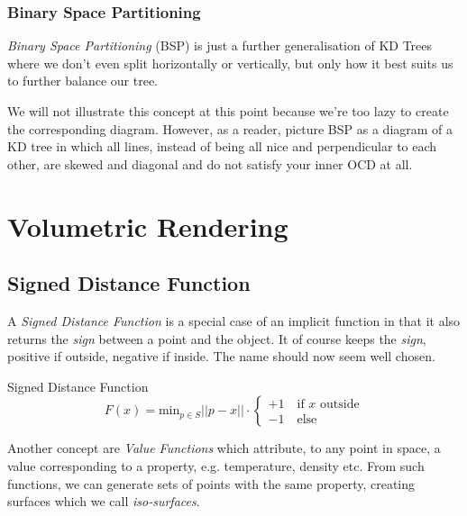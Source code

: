 \documentclass[english]{panikzettel}
\begin{document}
\subsubsection*{Binary Space Partitioning}

\textit{Binary Space Partitioning} (BSP) is just a further generalisation of KD Trees where we don't even split horizontally or vertically, but only how it best suits us to further balance our tree.

We will not illustrate this concept at this point because we're too lazy to create the corresponding diagram. However, as a reader, picture BSP as a diagram of a KD tree in which all lines, instead of being all nice and perpendicular to each other, are skewed and diagonal and do not satisfy your inner OCD at all.

\section{Volumetric Rendering}

\subsection{Signed Distance Function}

\begin{halfboxl}
A \emph{Signed Distance Function} is a special case of an implicit function in that it also returns the \emph{sign} between a point and the object. It of course keeps the \emph{sign}, positive if outside, negative if inside. The name should now seem well chosen.
\end{halfboxl}%
\begin{halfboxr}
\vspace{-\baselineskip}
\begin{defi}{Signed Distance Function}
\[F(x) = \text{min}_{p \in S} ||p - x|| \cdot \begin{cases} +1 \quad \text{if } x \text{ outside} \\ -1 \quad \text{else} \end{cases}\]
\end{defi}
\end{halfboxr}

Another concept are \emph{Value Functions} which attribute, to any point in space, a value corresponding to a property, e.g. temperature, density etc. From such functions, we can generate sets of points with the same property, creating surfaces which we call \emph{iso-surfaces}.
\end{document}
